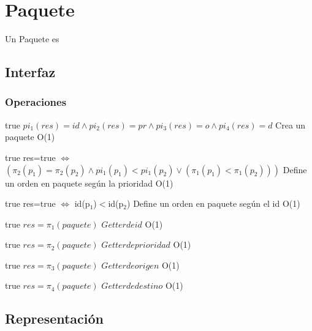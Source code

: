 \section{Paquete}

Un Paquete es

\subsection{Interfaz}



\subsubsection*{Operaciones}

 {true}
 {$pi_1(res)=id \land pi_2(res)=pr \land pi_3(res)=o \land pi_4(res)=d$}
 {Crea un paquete}
 {O(1)}
 {}
 
 {true}
 {res=true $\iff$ $(\pi_2(p_1)=\pi_2(p_2) \land pi_1(p_1)<pi_1(p_2) \lor (\pi_1(p_1)<\pi_1(p_2)))$}
 {Define un orden en paquete seg\'un la prioridad}
 {O(1)}
 {}
 
 {true}
 {res=true $\iff$ id(p$_1$)$<$id(p$_2$)}
 {Define un orden en paquete seg\'un el id}
 {O(1)}
 {}
 
 {true}
 {$res = \pi_1(paquete)$}
 {$Getter de id$}
 {O(1)}
 {}
 
 {true}
 {$res = \pi_2(paquete)$}
 {$Getter de prioridad$}
 {O(1)}
 {}
 
 {true}
 {$res = \pi_3(paquete)$}
 {$Getter de origen$}
 {O(1)}
 {}
 
 {true}
 {$res = \pi_4(paquete)$}
 {$Getter de destino$}
 {O(1)}
 {} 
\subsection{Representación}

